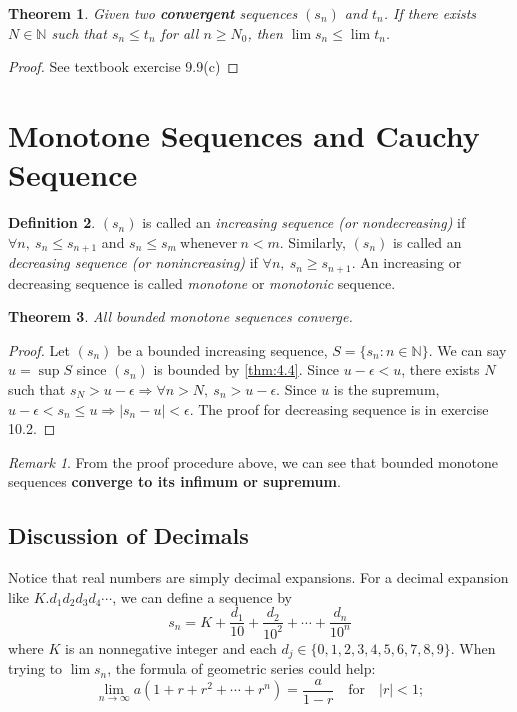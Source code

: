 \documentclass[12pt, lettersize]{book}
\theoremstyle{plain}
\newtheorem{thm}{Theorem}[section]
\theoremstyle{definition}
\newtheorem{dfn}[thm]{Definition}
\theoremstyle{remark}
\newtheorem*{rem}{Remark}
\newcommand{\N}{\mathbb{N}}
\begin{document}
		\begin{thm}
		Given two \textbf{convergent} sequences $(s_n)$ and $t_n$. If there exists $N\in\N$ such that $s_n\leq t_n$ for all $n\geq N_0$, then $\lim s_n\leq\lim t_n$.
		\end{thm}
		\begin{proof}
			See textbook exercise 9.9(c)
		\end{proof}
		\newpage
	\section{Monotone Sequences and Cauchy Sequence}
		\begin{dfn}
		$(s_n)$ is called an \emph{increasing sequence (or nondecreasing)} if $\forall n,\ s_n\leq s_{n+1}$ and $s_n\leq s_m\ \text{whenever}\ n<m$.
		Similarly, $(s_n)$ is called an \emph{decreasing sequence (or nonincreasing)} if $\forall n,\ s_n\geq s_{n+1}$. An increasing or decreasing sequence is called \emph{monotone} or \emph{monotonic} sequence.
		\end{dfn}
	
		\begin{thm}\label{def:bounded monotone seq}
		All bounded monotone sequences converge.
		\end{thm}
		\begin{proof}
		Let $(s_n)$ be a bounded increasing sequence, $S=\{s_n: n\in \mathbb{N}\}$. We can say $u=\sup S$ since $(s_n)$ is bounded by \ref{thm:4.4}. 
		Since $u-\epsilon<u$, there exists $N$ such that $s_N>u-\epsilon \Rightarrow \forall n>N,\ s_n>u-\epsilon$. Since $u$ is the supremum, $u-\epsilon<s_n\leq u \Rightarrow |s_n-u|<\epsilon$.
		The proof for decreasing sequence is in exercise 10.2.
		\end{proof}
		\begin{rem}
		From the proof procedure above, we can see that bounded monotone sequences \textbf{converge to its infimum or supremum}.
		\end{rem}
		
		\subsection*{Discussion of Decimals}
		Notice that real numbers are simply decimal expansions. For a decimal expansion like $K.d_1d_2d_3d_4\cdots$, we can define a sequence by
		\begin{displaymath}
			s_n=K+\frac{d_1}{10}+\frac{d_2}{10^2}+\cdots+\frac{d_n}{10^n}
		\end{displaymath} 
		where $K$ is an nonnegative integer and each $d_j\in\{0,1,2,3,4,5,6,7,8,9\}$. When trying to $\lim s_n$, the formula
		of geometric series could help:
		\begin{displaymath}
			\lim\limits_{n\rightarrow\infty}a(1+r+r^2+\cdots+r^n)=\frac{a}{1-r}\quad \text{for}\quad |r|<1;
		\end{displaymath}
		
\end{document}
